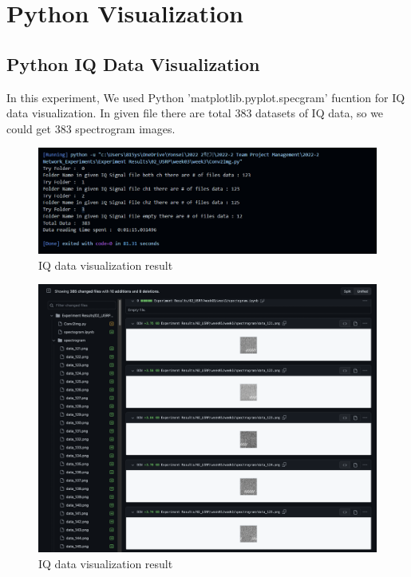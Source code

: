 \section{Python Visualization}
\subsection{Python IQ Data Visualization}
    In this experiment, We used Python 'matplotlib.pyplot.specgram' fucntion for IQ data visualization.
    In given file there are total 383 datasets of IQ data, so we could get 383 spectrogram images. \\
    \vspace{-4mm}  
    \begin{figure}[!h]\centering
    \hspace{15mm}
		\includegraphics[width=.85\textwidth]{image/week03/1-2-1.png}
		\caption{\footnotesize IQ data visualization result}
		\vspace{-10pt}
    \end{figure}
    
    \vspace{-4mm}  
    \begin{figure}[!h]\centering
    \hspace{15mm}
		\includegraphics[width=.85\textwidth]{image/week03/bla.png}
		\caption{\footnotesize IQ data visualization result}
		\vspace{-10pt}
    \end{figure}
\clearpage